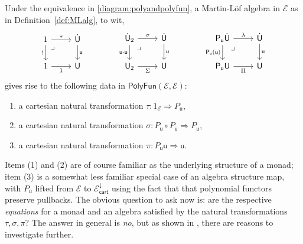 \documentclass[12pt,reqno]{amsart}
\newcommand{\EE}{\ensuremath{\mathcal{E}}}
\newcommand{\alg}[1]{\ensuremath{\mathsf{#1}}}
\renewcommand{\t}{\ensuremath{\mathsf{u}}}
\newcommand{\T}{\ensuremath{\mathsf{U}}}
\newcommand{\TT}{\ensuremath{\dot{\mathsf{U}}}}
\newcommand{\pbcorner}{\arrow[dr,phantom,"\lrcorner" very near start, shift right=.5ex]} %
\theoremstyle{remark}
\theoremstyle{definition}
\begin{document}
Under the equivalence in \eqref{diagram:polyandpolyfun}, a Martin-L\"of algebra in $\EE$ as in Definition~\ref{def:MLalg}, to wit,
\begin{equation}\label{diag:MLalg2}
\begin{tikzcd}
	1 \ar[r,"*"] \ar[d,swap,"!"] \pbcorner &  \TT \ar[d, "\t"]\\  
	1 \ar[r, swap,"\mathsf{1}"] & \T
 \end{tikzcd}\qquad \qquad 
 \begin{tikzcd}
	\TT_2  \ar[r,"\sigma"] \ar[d,swap,"\t\cdot\t"] \pbcorner &  \TT \ar[d, "\t"]\\  
	\T_2 \ar[r,swap, "\Sigma"] & \T
\end{tikzcd} \qquad \qquad 
	 \begin{tikzcd}
	\alg{P}_\t\TT \ar[r,"\lambda"] \ar[d,swap,"\alg{P}_\t(\t)"] \pbcorner &  \TT \ar[d, "\t"]\\  
	\alg{P}_\t\T \ar[r,swap, "\Pi"] & \T
 \end{tikzcd} 
 \end{equation}
gives rise to the following data in $\mathsf{PolyFun}(\EE, \EE)$:
\begin{enumerate}
\item a cartesian natural transformation $\tau :1_\EE \Rightarrow P_\t$,
\item a cartesian natural transformation $\sigma :P_\t\circ P_\t \Rightarrow P_\t$,
\item a cartesian natural transformation $\pi:P_\t\t \Rightarrow \t$.
\end{enumerate}
%
Items (1) and (2) are of course familiar as the underlying structure of a monad; item (3) is a somewhat less familiar special case of an algebra structure map, with $P_\t$ lifted from $\EE$ to $\EE^{\downarrow}_{\mathsf{cart}}$ using the fact that that polynomial functors preserve pullbacks.  The obvious question to ask now is: are the respective \emph{equations} for a monad and an algebra satisfied by the natural transformations $\tau, \sigma, \pi$?  The answer in general is \emph{no}, but as shown in \cite{Newstead:thesis, NA:2018}, there are reasons to investigate further.
 
\end{document}
